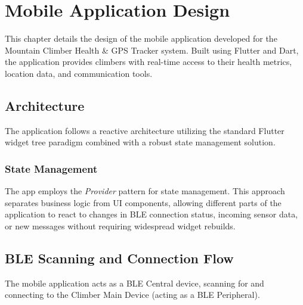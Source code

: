 \chapter{Mobile Application Design}
\label{ch:mobile_app_design}

This chapter details the design of the mobile application developed for the Mountain Climber Health \& GPS Tracker system. Built using Flutter and Dart, the application provides climbers with real-time access to their health metrics, location data, and communication tools.

\section{Architecture}

The application follows a reactive architecture utilizing the standard Flutter widget tree paradigm combined with a robust state management solution.

\subsection{State Management}
The app employs the \textit{Provider} pattern for state management. This approach separates business logic from UI components, allowing different parts of the application to react to changes in BLE connection status, incoming sensor data, or new messages without requiring widespread widget rebuilds.

\section{BLE Scanning and Connection Flow}

The mobile application acts as a BLE Central device, scanning for and connecting to the Climber Main Device (acting as a BLE Peripheral).

